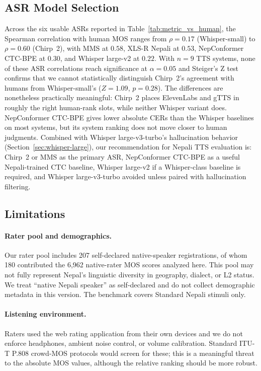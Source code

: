 \documentclass[11pt]{article}
\begin{document}
\subsection{ASR Model Selection}
Across the six usable ASRs reported in Table~\ref{tab:metric_vs_human}, the Spearman correlation with human MOS ranges from $\rho = 0.17$ (Whisper-small) to $\rho = 0.60$ (Chirp~2), with MMS at $0.58$, XLS-R Nepali at $0.53$, NepConformer CTC-BPE at $0.30$, and Whisper large-v2 at $0.22$. With $n = 9$ TTS systems, none of these ASR correlations reach significance at $\alpha = 0.05$ and Steiger's Z test confirms that we cannot statistically distinguish Chirp~2's agreement with humans from Whisper-small's ($Z = 1.09$, $p = 0.28$). The differences are nonetheless practically meaningful: Chirp~2 places ElevenLabs and gTTS in roughly the right human-rank slots, while neither Whisper variant does. NepConformer CTC-BPE gives lower absolute CERs than the Whisper baselines on most systems, but its system ranking does not move closer to human judgments. Combined with Whisper large-v3-turbo's hallucination behavior (Section~\ref{sec:whisper-large}), our recommendation for Nepali TTS evaluation is: Chirp~2 or MMS as the primary ASR, NepConformer CTC-BPE as a useful Nepali-trained CTC baseline, Whisper large-v2 if a Whisper-class baseline is required, and Whisper large-v3-turbo avoided unless paired with hallucination filtering.

\subsection{Limitations}

\paragraph{Rater pool and demographics.} Our rater pool includes 207 self-declared native-speaker registrations, of whom 180 contributed the 6{,}962 native-rater MOS scores analyzed here. This pool may not fully represent Nepal's linguistic diversity in geography, dialect, or L2 status. We treat ``native Nepali speaker'' as self-declared and do not collect demographic metadata in this version. The benchmark covers Standard Nepali stimuli only.

\paragraph{Listening environment.} Raters used the web rating application from their own devices and we do not enforce headphones, ambient noise control, or volume calibration. Standard ITU-T P.808 crowd-MOS protocols would screen for these; this is a meaningful threat to the absolute MOS values, although the relative ranking should be more robust.
\end{document}
